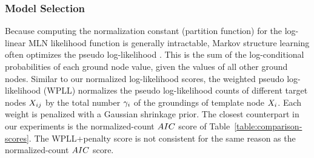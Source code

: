 \documentclass[letterpaper]{article}
\begin{document}
\subsubsection{Model Selection} 
%
%
Because computing the normalization constant (partition function) for the log-linear MLN likelihood function  is generally intractable, Markov structure learning often optimizes the pseudo log-likelihood \cite{Lowd2007,Kok2005a}. This is the sum of the log-conditional probabilities of each ground node value, given the values of all other ground nodes. 
%
Similar to our normalized log-likelihood scores, the weighted pseudo log-likelihood (WPLL) normalizes the pseudo log-likelihood counts of different target nodes $X_{ij}$ by the total number  $\gamma_{i}$ of the groundings of template node $X_{i}$.
Each weight is penalized with a Gaussian shrinkage prior. The closest counterpart in our experiments is the normalized-count $AIC$ score of Table~\ref{table:comparison-scores}. The WPLL+penalty score is not consistent for the same reason as the normalized-count $AIC$ score. 
\end{document}
